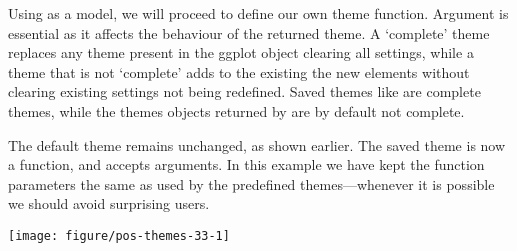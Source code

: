 \documentclass[krantz2]{krantz}\usepackage{knitr}%
\begin{document}
Using  as a model, we will proceed to define our own theme function. Argument  is essential as it affects the behaviour of the returned theme. A `complete' theme replaces any theme present in the ggplot object clearing all settings, while a theme that is not `complete' adds to the existing the new elements without clearing existing settings not being redefined. Saved themes like  are complete themes, while the themes objects returned by  are by default not complete.

\begin{knitrout}\footnotesize
{}\color{fgcolor}\begin{kframe}
\begin{alltt}
 \hlkwb{<-}
     \hlstd{(} \hlstd{=} \hlstd{,}  \hlstd{=} \hlstd{) \{}
        \hlstd{(}    \hlopt{+}
            \hlstd{(} \hlstd{=} \hlstd{(} \hlstd{=} \hlstd{),}  \hlstd{=} \hlstd{)}
    \hlstd{\}}
\end{alltt}
\end{kframe}
\end{knitrout}

The default theme remains unchanged, as shown earlier. The saved theme is now a function, and accepts arguments. In this example we have kept the function parameters the same as used by the predefined themes---whenever it is possible we should avoid surprising users.

\begin{knitrout}\footnotesize
{}\color{fgcolor}\begin{kframe}
\begin{alltt}
 \hlopt{+} \hlstd{(} \hlstd{=} \hlstd{)}
\end{alltt}
\end{kframe}

{\centering \texttt{[image: figure/pos-themes-33-1]} 

}



\end{knitrout}
\end{document}
